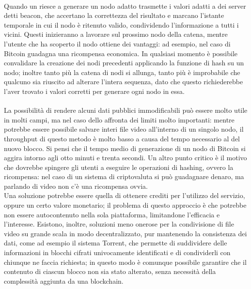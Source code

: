 	\paragraph*{} Quando un  riesce a generare un nodo adatto trasmette i valori adatti a dei server detti beacon, che accertano la correttezza del risultato e marcano l'istante temporale in cui il nodo è ritenuto valido, condividendo l'informazione a tutti i  vicini. Questi inizieranno a lavorare sul prossimo nodo della catena, mentre l'utente che ha scoperto il nodo ottiene dei vantaggi: ad esempio, nel caso di Bitcoin guadagna una ricompensa economica. In qualsiasi momento è possibile convalidare la creazione dei nodi precedenti applicando la funzione di hash su un nodo; inoltre tanto più la catena di nodi si allunga, tanto più è improbabile che qualcuno sia riuscito ad alterare l'intera sequenza, dato che questo richiederebbe l'aver trovato i valori corretti per generare ogni nodo in essa.
	\paragraph*{}
	La possibilità di rendere alcuni dati pubblici immodificabili può essere molto utile in molti campi, ma nel caso dello  affronta dei limiti molto importanti: mentre potrebbe essere possibile salvare interi file video all'interno di un singolo nodo, il throughput di questo metodo è molto basso a causa del tempo necessario al  del nuovo blocco. Si pensi che il tempo medio di generazione di un nodo di Bitcoin si aggira intorno agli otto minuti e trenta secondi. Un altro punto critico è il motivo che dovrebbe spingere gli utenti a eseguire le operazioni di hashing, ovvero la ricompensa: nel caso di un sistema di criptovaluta si può guadagnare denaro, ma parlando di  video non c'è una ricompensa ovvia.
	\\
	Una soluzione potrebbe essere quella di ottenere crediti per l'utilizzo del servizio, oppure un certo valore monetario; il problema di questo approccio è che potrebbe non essere autocontenuto nella sola piattaforma, limitandone l'efficacia e l'interesse. Esistono, inoltre, soluzioni meno onerose per la condivisione di file video su grande scala in modo decentralizzato, pur mantenendo la consistenza dei dati, come ad esempio il sistema Torrent, che permette di suddividere delle informazioni in blocchi cifrati univocamente identificati e di condividerli con chiunque ne faccia richiesta; in questo modo è comunque possibile garantire che il contenuto di ciascun blocco non sia stato alterato, senza necessità della complessità aggiunta da una blockchain.

